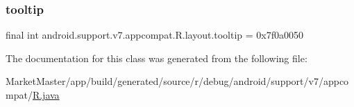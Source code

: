 \mbox{\label{classandroid_1_1support_1_1v7_1_1appcompat_1_1R_1_1layout_a9b8611758f3e13416ae1d2143aa041b7}} 
\subsubsection{\texorpdfstring{tooltip}{tooltip}}
{\footnotesize\ttfamily final int android.\+support.\+v7.\+appcompat.\+R.\+layout.\+tooltip = 0x7f0a0050\hspace{0.3cm}{\ttfamily [static]}}



The documentation for this class was generated from the following file\+:\begin{DoxyCompactItemize}
\item 
Market\+Master/app/build/generated/source/r/debug/android/support/v7/appcompat/\mbox{\hyperlink{debug_2android_2support_2v7_2appcompat_2R_8java}{R.\+java}}\end{DoxyCompactItemize}
